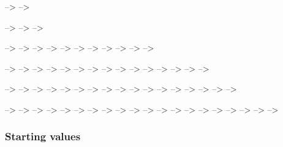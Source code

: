 \documentclass[
  ,man]{apa6}
\begin{document}
--\textgreater{}
--\textgreater{}

--\textgreater{}
--\textgreater{}
--\textgreater{}

--\textgreater{}
--\textgreater{}
--\textgreater{}
--\textgreater{}
--\textgreater{}
--\textgreater{}
--\textgreater{}
--\textgreater{}
--\textgreater{}
--\textgreater{}
--\textgreater{}

--\textgreater{}
--\textgreater{}
--\textgreater{}
--\textgreater{}
--\textgreater{}
--\textgreater{}
--\textgreater{}
--\textgreater{}
--\textgreater{}
--\textgreater{}
--\textgreater{}
--\textgreater{}
--\textgreater{}
--\textgreater{}
--\textgreater{}

--\textgreater{}
--\textgreater{}
--\textgreater{}
--\textgreater{}
--\textgreater{}
--\textgreater{}
--\textgreater{}
--\textgreater{}
--\textgreater{}
--\textgreater{}
--\textgreater{}
--\textgreater{}
--\textgreater{}
--\textgreater{}
--\textgreater{}
--\textgreater{}
--\textgreater{}

--\textgreater{}
--\textgreater{}
--\textgreater{}
--\textgreater{}
--\textgreater{}
--\textgreater{}
--\textgreater{}
--\textgreater{}
--\textgreater{}
--\textgreater{}
--\textgreater{}
--\textgreater{}
--\textgreater{}
--\textgreater{}
--\textgreater{}
--\textgreater{}
--\textgreater{}
--\textgreater{}
--\textgreater{}
--\textgreater{}

\hypertarget{starting-values}{%
\subsubsection{Starting values}\label{starting-values}}
\end{document}
